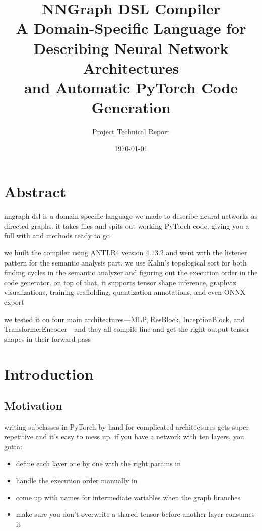 \documentclass{nngraph-en}
\title{
    \textbf{NNGraph DSL Compiler} \\[0.5em]
    \large A Domain-Specific Language for Describing Neural Network Architectures \\
    and Automatic PyTorch Code Generation
}
\author{\large Project Technical Report}
\date{\today}
\begin{document}
\maketitle
\tableofcontents
\newpage

\chapter*{Abstract}

nngraph dsl is a domain-specific language we made to describe neural networks as directed graphs. it takes  files and spits out working PyTorch code, giving you a full  with  and  methods ready to go

we built the compiler using ANTLR4 version 4.13.2 and went with the listener pattern for the semantic analysis part. we use Kahn's topological sort for both finding cycles in the semantic analyzer and figuring out the execution order in the code generator. on top of that, it supports tensor shape inference, graphviz visualizations, training scaffolding, quantization annotations, and even ONNX export

we tested it on four main architectures---MLP, ResBlock, InceptionBlock, and TransformerEncoder---and they all compile fine and get the right output tensor shapes in their forward pass

\chapter{Introduction}

\section{Motivation}

writing  subclasses in PyTorch by hand for complicated architectures gets super repetitive and it's easy to mess up. if you have a network with ten layers, you gotta:

\begin{itemize}
    \item define each layer one by one with the right params in 
    \item handle the execution order manually in 
    \item come up with names for intermediate variables when the graph branches
    \item make sure you don't overwrite a shared tensor before another layer consumes it
\end{itemize}
\end{document}
